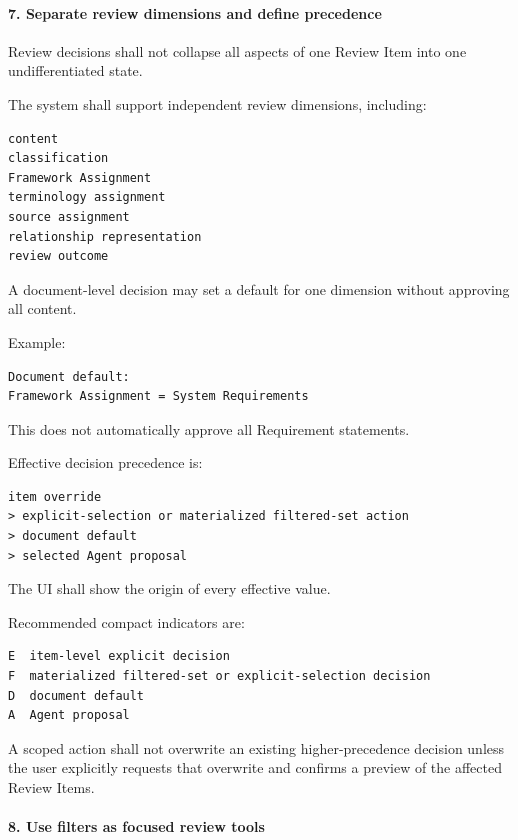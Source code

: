 \hypertarget{7-separate-review-dimensions-and-define-precedence}{%
\paragraph{7. Separate review dimensions and define precedence}\label{7-separate-review-dimensions-and-define-precedence}}

Review decisions shall not collapse all aspects of one Review Item into one undifferentiated state.

The system shall support independent review dimensions, including:

\begin{verbatim}
content
classification
Framework Assignment
terminology assignment
source assignment
relationship representation
review outcome
\end{verbatim}

A document-level decision may set a default for one dimension without approving all content.

Example:

\begin{verbatim}
Document default:
Framework Assignment = System Requirements
\end{verbatim}

This does not automatically approve all Requirement statements.

Effective decision precedence is:

\begin{verbatim}
item override
> explicit-selection or materialized filtered-set action
> document default
> selected Agent proposal
\end{verbatim}

The UI shall show the origin of every effective value.

Recommended compact indicators are:

\begin{verbatim}
E  item-level explicit decision
F  materialized filtered-set or explicit-selection decision
D  document default
A  Agent proposal
\end{verbatim}

A scoped action shall not overwrite an existing higher-precedence decision unless the user explicitly requests that overwrite and confirms a preview of the affected Review Items.

\hypertarget{8-use-filters-as-focused-review-tools}{%
\paragraph{8. Use filters as focused review tools}\label{8-use-filters-as-focused-review-tools}}

